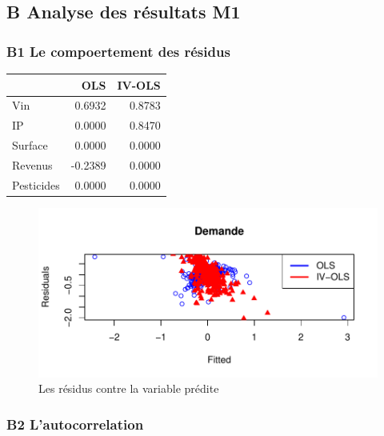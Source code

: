\documentclass[11pt,]{article}
\begin{document}
\FloatBarrier

\newpage

\hypertarget{b-analyse-des-resultats-m1}{%
\subsection{B Analyse des résultats
M1}\label{b-analyse-des-resultats-m1}}

\hypertarget{b1-le-compoertement-des-residus}{%
\subsubsection{B1 Le compoertement des
résidus}\label{b1-le-compoertement-des-residus}}

\FloatBarrier

\begin{longtable}[]{@{}lrr@{}}
\toprule
& OLS & IV-OLS\tabularnewline
\midrule
\endhead
Vin & 0.6932 & 0.8783\tabularnewline
IP & 0.0000 & 0.8470\tabularnewline
Surface & 0.0000 & 0.0000\tabularnewline
Revenus & -0.2389 & 0.0000\tabularnewline
Pesticides & 0.0000 & 0.0000\tabularnewline
\bottomrule
\end{longtable}

\FloatBarrier

\FloatBarrier

\begin{figure}[!htbp]

{\centering \includegraphics{note2pres_files/figure-latex/unnamed-chunk-60-1} 

}

\caption{Les résidus contre la variable prédite}\label{fig:unnamed-chunk-60}
\end{figure}

\FloatBarrier

\hypertarget{b2-lautocorrelation}{%
\subsubsection{B2 L'autocorrelation}\label{b2-lautocorrelation}}
\end{document}
